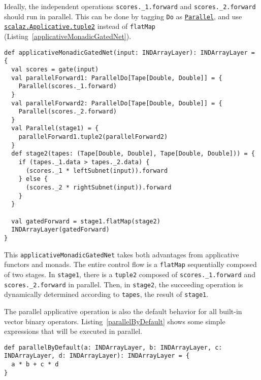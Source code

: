 Ideally, the independent operations \lstinline{scores._1.forward} and \lstinline{scores._2.forward} should run in parallel. This can be done by tagging \lstinline{Do} as \href{https://javadoc.io/page/org.scalaz/scalaz_2.11/latest/scalaz/Tags%24%24Parallel.html}{\lstinline{Parallel}}, and use \href{https://javadoc.io/page/org.scalaz/scalaz_2.11/latest/scalaz/Applicative.html#tuple2[A,B](fa:=>F[A],fb:=>F[B]):F[(A,B)]}{\lstinline{scalaz.Applicative.tuple2}}\cite{mcbride2008applicative} instead of \lstinline{flatMap} (Listing~\ref{applicativeMonadicGatedNet}).

\begin{lstlisting}[float={h t b p},caption={Applicative + monadic gated network}, label={applicativeMonadicGatedNet}]
def applicativeMonadicGatedNet(input: INDArrayLayer): INDArrayLayer = {
  val scores = gate(input)
  val parallelForward1: ParallelDo[Tape[Double, Double]] = {
    Parallel(scores._1.forward)
  }
  val parallelForward2: ParallelDo[Tape[Double, Double]] = {
    Parallel(scores._2.forward)
  }
  val Parallel(stage1) = {
  	parallelForward1.tuple2(parallelForward2)
  }
  def stage2(tapes: (Tape[Double, Double], Tape[Double, Double])) = {
    if (tapes._1.data > tapes._2.data) {
      (scores._1 * leftSubnet(input)).forward
    } else {
      (scores._2 * rightSubnet(input)).forward
    }
  }

  val gatedForward = stage1.flatMap(stage2)
  INDArrayLayer(gatedForward)
}
\end{lstlisting}

This \lstinline{applicativeMonadicGatedNet} takes both advantages from applicative functors and monads. The entire control flow is a \lstinline{flatMap} sequentially composed of two stages. In \lstinline{stage1}, there is a \lstinline{tuple2} composed of \lstinline{scores._1.forward} and \lstinline{scores._2.forward} in parallel. Then, in \lstinline{stage2}, the succeeding operation is dynamically determined according to \lstinline{tapes}, the result of \lstinline{stage1}.

The parallel applicative operation is also the default behavior for all built-in vector binary operators. Listing~\ref{parallelByDefault} shows some simple expressions that will be executed in parallel.

\begin{lstlisting}[float={h t b p},caption={By default, \lstinline{a * b} and \lstinline{c * d} will be executed in parallel because they are independent}, label={parallelByDefault}]
def parallelByDefault(a: INDArrayLayer, b: INDArrayLayer, c: INDArrayLayer, d: INDArrayLayer): INDArrayLayer = {
  a * b + c * d
}
\end{lstlisting}

